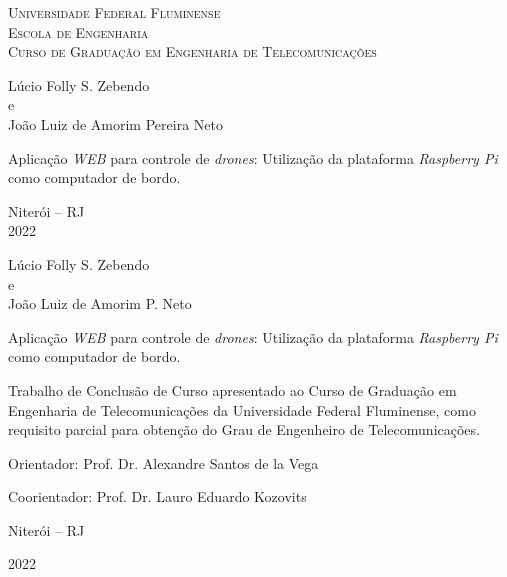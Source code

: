 \documentclass[12pt,a4paper,oneside]{book}
\begin{document}
%


\begin{titlepage}
  \begin{center}
    \Large{\textsc{Universidade Federal Fluminense} \\
           \textsc{Escola de Engenharia} \\
           \textsc{Curso de Graduação em Engenharia de Telecomunicações} 
          }
    \par\vfill
    \LARGE{Lúcio Folly S. Zebendo\\e\\João Luiz de Amorim Pereira Neto}
    \par\vfill
    \LARGE{Aplica\c{c}\~{a}o \textit{WEB} para controle de \textit{drones}: Utilização da plataforma \textit{Raspberry Pi} como computador de bordo.}
    \par\vfill
    \Large{Niterói -- RJ\\
    2022}
  \end{center}
\end{titlepage}




\begin{center}

Lúcio Folly S. Zebendo\\e\\João Luiz de Amorim P. Neto

\vfill

Aplica\c{c}\~{a}o \textit{WEB} para controle de \textit{drones}: Utilização da plataforma \textit{Raspberry Pi} como computador de bordo.

\vspace{3.0cm}

\begin{flushright}
\begin{minipage}{0.55\textwidth}
%
Trabalho de Conclusão de Curso 
apresentado ao Curso de Graduação em Engenharia de Telecomunicações 
da Universidade Federal Fluminense, 
como requisito parcial para obtenção 
do Grau de Engenheiro de Telecomunicações. 
%
\end{minipage}
\end{flushright}

\vspace{3.0cm}

Orientador: Prof. Dr. Alexandre Santos de la Vega

Coorientador: Prof. Dr. Lauro Eduardo Kozovits
\vfill

Niterói -- RJ

2022

\end{center}
\end{document}
